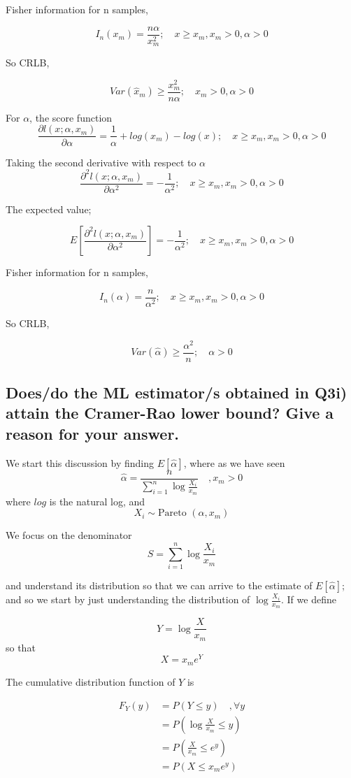 \documentclass[]{article}
\begin{document}
\noindent Fisher information for n samples,

$$
I_n(x_m) = \frac{n\alpha}{x_m^2};\quad x\ge x_m, x_m>0, \alpha>0
$$

\noindent So CRLB,

$$
Var(\widehat{x}_m) \ge \frac{x_m^2}{n\alpha};\quad x_m>0, \alpha>0
$$

\noindent For $\alpha$, the score function
$$
\frac{\partial l(x; \alpha, x_m)}{\partial \alpha} = \frac{1}{\alpha} + log(x_m) - log(x) ;\quad x\ge x_m, x_m>0, \alpha>0
$$

\noindent Taking the second derivative with respect to $\alpha$
$$
\frac{\partial^2 l(x; \alpha, x_m)}{\partial \alpha^2} = -\frac{1}{\alpha^2} ;\quad x\ge x_m, x_m>0, \alpha>0
$$

\noindent The expected value;

$$
E \left[ \frac{\partial^2 l(x; \alpha, x_m)}{\partial \alpha^2} \right]  = -\frac{1}{\alpha^2} ;\quad x\ge x_m, x_m>0, \alpha>0
$$

\noindent Fisher information for n samples,

$$
I_n(\alpha) = \frac{n}{\alpha^2};\quad x\ge x_m, x_m>0, \alpha>0
$$

\noindent So CRLB,

$$
Var(\widehat{\alpha}) \ge \frac{\alpha^2}{n};\quad \alpha>0
$$


\subsection{Does/do the ML estimator/s obtained in Q3i) attain the Cramer-Rao lower bound?  Give a reason for your answer. }

We start this discussion by finding $E[\widehat{\alpha}]$, where as we have seen
$$
\widehat{\alpha} = \frac{n}{\sum_{i=1}^{n} \log \frac{X_i}{x_m}} \quad, x_m >0
$$
where $log$ is the natural log, and 
$$
X_i \sim \text{Pareto }(\alpha, x_m)
$$

\noindent We focus on the denominator
$$
S = \sum_{i=1}^{n} \log \frac{X_i}{x_m}
$$

\noindent and understand its distribution so that we can arrive to the estimate of $E[\widehat{\alpha}]$; and so we start by just understanding the distribution of $ \log \frac{X_i}{x_m}$. If we define

$$
Y = \log \frac{X}{x_m}
$$
so that 
$$
X = x_m e^{Y}
$$

The cumulative distribution function of $Y$ is

\begin{align*}
	F_Y(y) &= P(Y \leq y) \quad, \forall y \\
			&= P(\log \frac{X}{x_m} \leq y) \\
			&= P(\frac{X}{x_m} \leq e^{y}) \\
			&= P(X \leq x_m e^{y}) \\
\end{align*}
\end{document}
